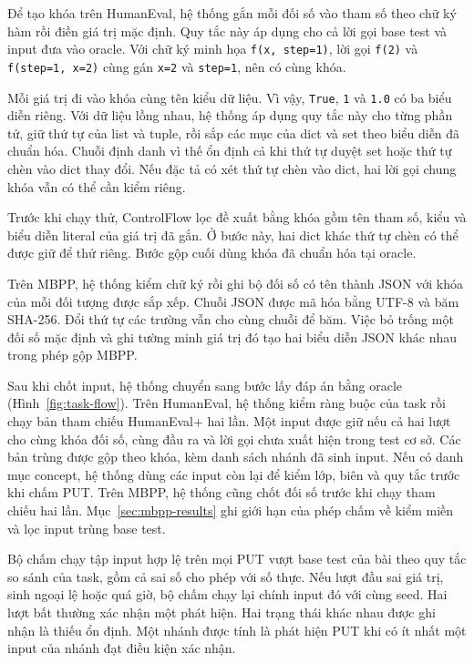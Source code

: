 Để tạo khóa trên HumanEval, hệ thống gắn mỗi đối số vào tham số theo chữ ký hàm rồi điền giá trị mặc định. Quy tắc này áp dụng cho cả lời gọi base test và input đưa vào oracle. Với chữ ký minh họa \texttt{f(x, step=1)}, lời gọi \texttt{f(2)} và \texttt{f(step=1, x=2)} cùng gán \texttt{x=2} và \texttt{step=1}, nên có cùng khóa.

Mỗi giá trị đi vào khóa cùng tên kiểu dữ liệu. Vì vậy, \texttt{True}, \texttt{1} và \texttt{1.0} có ba biểu diễn riêng. Với dữ liệu lồng nhau, hệ thống áp dụng quy tắc này cho từng phần tử, giữ thứ tự của list và tuple, rồi sắp các mục của dict và set theo biểu diễn đã chuẩn hóa. Chuỗi định danh vì thế ổn định cả khi thứ tự duyệt set hoặc thứ tự chèn vào dict thay đổi. Nếu đặc tả có xét thứ tự chèn vào dict, hai lời gọi chung khóa vẫn có thể cần kiểm riêng.

Trước khi chạy thử, ControlFlow lọc đề xuất bằng khóa gồm tên tham số, kiểu và biểu diễn literal của giá trị đã gắn. Ở bước này, hai dict khác thứ tự chèn có thể được giữ để thử riêng. Bước gộp cuối dùng khóa đã chuẩn hóa tại oracle.

Trên MBPP, hệ thống kiểm chữ ký rồi ghi bộ đối số có tên thành JSON với khóa của mỗi đối tượng được sắp xếp. Chuỗi JSON được mã hóa bằng UTF-8 và băm SHA-256. Đổi thứ tự các trường vẫn cho cùng chuỗi để băm. Việc bỏ trống một đối số mặc định và ghi tường minh giá trị đó tạo hai biểu diễn JSON khác nhau trong phép gộp MBPP.

Sau khi chốt input, hệ thống chuyển sang bước lấy đáp án bằng oracle (Hình~\ref{fig:task-flow}). Trên HumanEval, hệ thống kiểm ràng buộc của task rồi chạy bản tham chiếu HumanEval+ hai lần. Một input được giữ nếu cả hai lượt cho cùng khóa đối số, cùng đầu ra và lời gọi chưa xuất hiện trong test cơ sở. Các bản trùng được gộp theo khóa, kèm danh sách nhánh đã sinh input. Nếu có danh mục concept, hệ thống dùng các input còn lại để kiểm lớp, biên và quy tắc trước khi chấm PUT. Trên MBPP, hệ thống cũng chốt đối số trước khi chạy tham chiếu hai lần. Mục~\ref{sec:mbpp-results} ghi giới hạn của phép chấm về kiểm miền và lọc input trùng base test.

Bộ chấm chạy tập input hợp lệ trên mọi PUT vượt base test của bài theo quy tắc so sánh của task, gồm cả sai số cho phép với số thực. Nếu lượt đầu sai giá trị, sinh ngoại lệ hoặc quá giờ, bộ chấm chạy lại chính input đó với cùng seed. Hai lượt bất thường xác nhận một phát hiện. Hai trạng thái khác nhau được ghi nhận là thiếu ổn định. Một nhánh được tính là phát hiện PUT khi có ít nhất một input của nhánh đạt điều kiện xác nhận.

